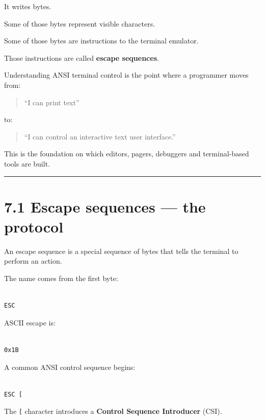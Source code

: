 \documentclass[
  oneside,
  openany]{book}
\begin{document}
It writes bytes.

Some of those bytes represent visible characters.

Some of those bytes are instructions to the terminal emulator.

Those instructions are called \textbf{escape sequences}.

Understanding ANSI terminal control is the point where a programmer
moves from:

\begin{quote}
``I can print text''
\end{quote}

to:

\begin{quote}
``I can control an interactive text user interface.''
\end{quote}

This is the foundation on which editors, pagers, debuggers and
terminal-based tools are built.

\begin{center}\rule{0.5\linewidth}{0.5pt}\end{center}

\hypertarget{escape-sequences-the-protocol}{%
\section{7.1 Escape sequences --- the
protocol}\label{escape-sequences-the-protocol}}

An escape sequence is a special sequence of bytes that tells the
terminal to perform an action.

The name comes from the first byte:

\begin{verbatim}

ESC
\end{verbatim}

ASCII escape is:

\begin{verbatim}

0x1B
\end{verbatim}

A common ANSI control sequence begins:

\begin{verbatim}

ESC [
\end{verbatim}

The \texttt{{[}} character introduces a \textbf{Control Sequence
Introducer} (CSI).
\end{document}
